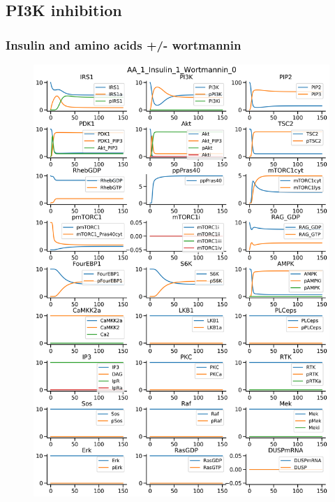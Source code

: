 \documentclass{beamer}
\begin{document}
\subsection{PI3K inhibition} %
\begin{frame}
\frametitle{Insulin and amino acids +/- wortmannin}
\begin{figure}
    \begin{minipage}{0.45\textwidth}
        \centering
        \includegraphics[width=\textwidth]{../simulations/ExtendedPI3KModel/validations/AAWithInsulinWithWortmannin/AA_1_Insulin_1_Wortmannin_0-6.png}
    \end{minipage}
    \begin{minipage}{0.45\textwidth}

\end{minipage}
\end{figure}
\end{frame}
\end{document}
